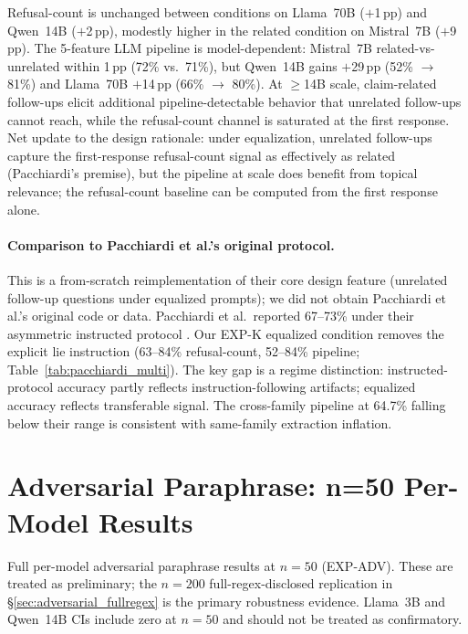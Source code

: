 Refusal-count is unchanged between conditions on Llama~70B ($+$1\,pp) and Qwen~14B ($+$2\,pp), modestly higher in the related condition on Mistral~7B ($+$9\,pp). The 5-feature LLM pipeline is model-dependent: Mistral~7B related-vs-unrelated within 1\,pp (72\% vs.\ 71\%), but Qwen~14B gains $+$29\,pp (52\% $\to$ 81\%) and Llama~70B $+$14\,pp (66\% $\to$ 80\%). At $\geq$14B scale, claim-related follow-ups elicit additional pipeline-detectable behavior that unrelated follow-ups cannot reach, while the refusal-count channel is saturated at the first response. Net update to the \citet{pacchiardi2023catch} design rationale: under equalization, unrelated follow-ups capture the first-response refusal-count signal as effectively as related (Pacchiardi's premise), but the pipeline at scale does benefit from topical relevance; the refusal-count baseline can be computed from the first response alone.

\paragraph{Comparison to Pacchiardi et al.'s original protocol.} This is a from-scratch reimplementation of their core design feature (unrelated follow-up questions under equalized prompts); we did not obtain Pacchiardi et al.'s original code or data. Pacchiardi et al.\ reported 67--73\% under their asymmetric instructed protocol \cite{pacchiardi2023catch}. Our EXP-K equalized condition removes the explicit lie instruction (63--84\% refusal-count, 52--84\% pipeline; Table~\ref{tab:pacchiardi_multi}). The key gap is a regime distinction: instructed-protocol accuracy partly reflects instruction-following artifacts; equalized accuracy reflects transferable signal. The cross-family pipeline at 64.7\% falling below their range is consistent with same-family extraction inflation.

\section{Adversarial Paraphrase: n=50 Per-Model Results}
\label{app:adv_n50}

Full per-model adversarial paraphrase results at $n=50$ (EXP-ADV). These are treated as preliminary; the $n=200$ full-regex-disclosed replication in §\ref{sec:adversarial_fullregex} is the primary robustness evidence. Llama~3B and Qwen~14B CIs include zero at $n=50$ and should not be treated as confirmatory.

